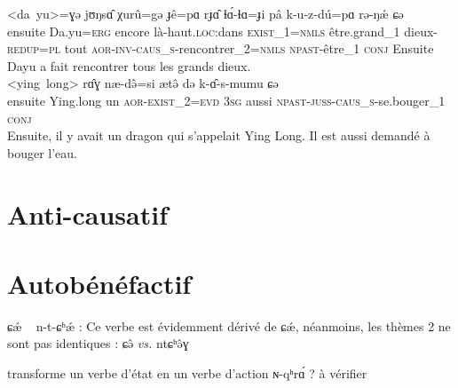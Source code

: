 \documentclass[11pt, a4paper]{book}              %
\newcommand{\ipa}[1]{{\phon \mbox{#1}}} %
\begin{document}
\begin{exe}
\begin{xlist}
 \ex 
\gll  \ipa{ægærêsi} \ipa{<da yu>=ɣə} \ipa{jʊŋsɑ̂} \ipa{χurû=gə} \ipa{ɟê=pɑ} \ipa{rɟɑ̂} \ipa{ɬɑ́-ɬɑ=ɟi} \ipa{pâ} \ipa{k-u-z-dú=pɑ} \ipa{rə-ŋǽ} \ipa{ɕə} \\
ensuite Da.yu=\textsc{erg} encore là-haut.\textsc{loc:}dans \textsc{exist_1=nmls} être.grand_1 dieux-\textsc{redup=pl} tout
\textsc{aor-inv-caus_s-}rencontrer_2=\textsc{nmls} \textsc{npast-}être_1 \textsc{conj}
Ensuite Dayu a fait rencontrer tous les grands dieux. \\


\ex 
\gll \ipa{æɕə} \ipa{<ying long>} \ipa{rɑ̂ɣ} \ipa{næ-də̂=si} \ipa{ætə̂} \ipa{də} \ipa{k-ɑ̂-s-mumu} \ipa{ɕə} \\
ensuite Ying.long un \textsc{aor}-\textsc{exist_2=evd}  \textsc{3sg} aussi \textsc{npast-juss-caus_s-}se.bouger_1 \textsc{conj}\\
Ensuite, il y avait un dragon qui s'appelait Ying Long. Il est aussi demandé à bouger l'eau. \\




\end{xlist}
\end{exe}

\section{Anti-causatif}

\section{Autobénéfactif}

\ipa{ɕǽ} ~ \ipa{n-t-ɕʰǽ} : Ce verbe est évidemment dérivé de \ipa{ɕǽ}, néanmoins, les thèmes 2 ne sont pas identiques :
\ipa{ɕə̂} \textit{vs.} \ipa{ntɕʰə̂ɣ}

transforme un verbe d'état en un verbe d'action \ipa{ɴ-qʰrɑ́} ? à vérifier
\end{document}
